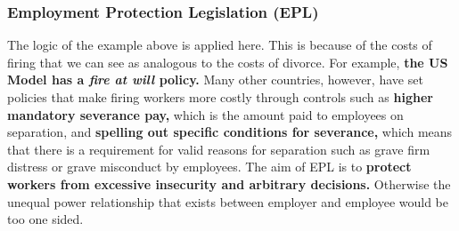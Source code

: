 \documentclass[12pt, letterpaper]{article}
\begin{document}
\subsubsection{Employment Protection Legislation (EPL)}
\begin{center}
\noindent{}
\end{center}
The logic of the example above is applied here. This is because of the costs of firing that we can see as analogous to the costs of divorce. For example, \textbf{the US Model has a \textit{fire at will} policy.} Many other countries, however, have set policies that make firing workers more costly through controls such as \textbf{higher mandatory severance pay,} which is the amount paid to employees on separation, and \textbf{spelling out specific conditions for severance,} which means that there is a requirement for valid reasons for separation such as grave firm distress or grave misconduct by employees. The aim of EPL is to \textbf{protect workers from excessive insecurity and arbitrary decisions.} Otherwise the unequal power relationship that exists between employer and employee would be too one sided. 
\end{document}
